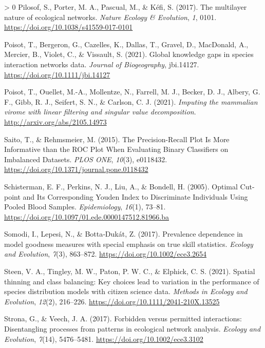 \documentclass[10pt,oneside]{article}
\newlength{\cslhangindent}
\newenvironment{CSLReferences}[3] %
 {%
  \setlength{\parindent}{0pt}
  \ifodd #1 \everypar{\setlength{\hangindent}{\cslhangindent}}\ignorespaces\fi
  \ifnum #2 > 0
  \setlength{\parskip}{#2\baselineskip}
  \fi
 }%
 {}
\begin{document}
\begin{CSLReferences}{1}{0}
\leavevmode\hypertarget{ref-Pilosof2017MulNat}{}%
Pilosof, S., Porter, M. A., Pascual, M., \& Kéfi, S. (2017). The
multilayer nature of ecological networks. \emph{Nature Ecology \&
Evolution}, \emph{1}, 0101.
\url{https://doi.org/10.1038/s41559-017-0101}

\leavevmode\hypertarget{ref-Poisot2021GloKno}{}%
Poisot, T., Bergeron, G., Cazelles, K., Dallas, T., Gravel, D.,
MacDonald, A., Mercier, B., Violet, C., \& Vissault, S. (2021). Global
knowledge gaps in species interaction networks data. \emph{Journal of
Biogeography}, jbi.14127. \url{https://doi.org/10.1111/jbi.14127}

\leavevmode\hypertarget{ref-Poisot2021ImpMam}{}%
Poisot, T., Ouellet, M.-A., Mollentze, N., Farrell, M. J., Becker, D.
J., Albery, G. F., Gibb, R. J., Seifert, S. N., \& Carlson, C. J.
(2021). \emph{Imputing the mammalian virome with linear filtering and
singular value decomposition}. \url{http://arxiv.org/abs/2105.14973}

\leavevmode\hypertarget{ref-Saito2015PrePlo}{}%
Saito, T., \& Rehmsmeier, M. (2015). The Precision-Recall Plot Is More
Informative than the ROC Plot When Evaluating Binary Classifiers on
Imbalanced Datasets. \emph{PLOS ONE}, \emph{10}(3), e0118432.
\url{https://doi.org/10.1371/journal.pone.0118432}

\leavevmode\hypertarget{ref-Schisterman2005OptCut}{}%
Schisterman, E. F., Perkins, N. J., Liu, A., \& Bondell, H. (2005).
Optimal Cut-point and Its Corresponding Youden Index to Discriminate
Individuals Using Pooled Blood Samples. \emph{Epidemiology},
\emph{16}(1), 73--81.
\url{https://doi.org/10.1097/01.ede.0000147512.81966.ba}

\leavevmode\hypertarget{ref-Somodi2017PreDep}{}%
Somodi, I., Lepesi, N., \& Botta‐Dukát, Z. (2017). Prevalence dependence
in model goodness measures with special emphasis on true skill
statistics. \emph{Ecology and Evolution}, \emph{7}(3), 863--872.
\url{https://doi.org/10.1002/ece3.2654}

\leavevmode\hypertarget{ref-Steen2021SpaThi}{}%
Steen, V. A., Tingley, M. W., Paton, P. W. C., \& Elphick, C. S. (2021).
Spatial thinning and class balancing: Key choices lead to variation in
the performance of species distribution models with citizen science
data. \emph{Methods in Ecology and Evolution}, \emph{12}(2), 216--226.
\url{https://doi.org/10.1111/2041-210X.13525}

\leavevmode\hypertarget{ref-Strona2017ForPer}{}%
Strona, G., \& Veech, J. A. (2017). Forbidden versus permitted
interactions: Disentangling processes from patterns in ecological
network analysis. \emph{Ecology and Evolution}, \emph{7}(14),
5476--5481. \url{https://doi.org/10.1002/ece3.3102}


\end{CSLReferences}
\end{document}
